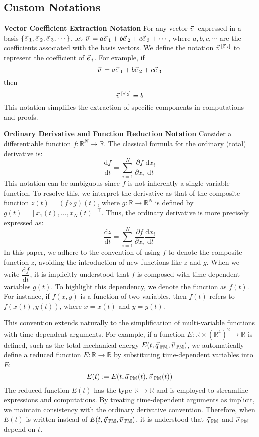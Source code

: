 \documentclass[12pt]{amsart}
\let\oldvec\vec
\renewcommand{\vec}[1]{\oldvec{#1}\hspace{0.1em}}
\begin{document}
\subsection{Custom Notations}

\textbf{Vector Coefficient Extraction Notation}  
   For any vector $\vec{v}$ expressed in a basis $\{\vec{e}_1, \vec{e}_2, \vec{e}_3, \cdots\}$, let $\vec{v} = a\vec{e}_1 + b\vec{e}_2 + c\vec{e}_3 + \cdots$, where $a, b, c, \cdots$ are the coefficients associated with the basis vectors. We define the notation $\vec{v}^{[\vec{e}_i]}$ to represent the coefficient of $\vec{e}_i$. For example, if
   $$
   \vec{v} = a \vec{e}_1 + b \vec{e}_2 + c \vec{e}_3
   $$
   then
   $$
   \vec{v}^{[\vec{e}_2]} = b
   $$
   This notation simplifies the extraction of specific components in computations and proofs.

\textbf{Ordinary Derivative and Function Reduction Notation}  
   Consider a differentiable function $f: \mathbb{R}^N \to \mathbb{R}$. The classical formula for the ordinary (total) derivative is:
   $$
   \dfrac{\mathrm{d} f}{\mathrm{d} t} = \sum_{i=1}^N \dfrac{\partial f}{\partial x_i} \dfrac{\mathrm{d} x_i}{\mathrm{d} t}
   $$
   This notation can be ambiguous since $f$ is not inherently a single-variable function. To resolve this, we interpret the derivative as that of the composite function $z(t) = (f \circ g)(t)$, where $g: \mathbb{R} \to \mathbb{R}^N$ is defined by $g(t) = [x_1(t), \dots, x_N(t)]^\top$. Thus, the ordinary derivative is more precisely expressed as:
   $$
   \dfrac{\mathrm{d} z}{\mathrm{d} t} = \sum_{i=1}^N \dfrac{\partial f}{\partial x_i} \dfrac{\mathrm{d} x_i}{\mathrm{d} t}
   $$
   In this paper, we adhere to the convention of using $f$ to denote the composite function $z$, avoiding the introduction of new functions like $z$ and $g$. When we write $\dfrac{\mathrm{d} f}{\mathrm{d} t}$, it is implicitly understood that $f$ is composed with time-dependent variables $g(t)$. To highlight this dependency, we denote the function as $f(t)$. For instance, if $f(x, y)$ is a function of two variables, then $f(t)$ refers to $f(x(t), y(t))$, where $x = x(t)$ and $y = y(t)$.

   This convention extends naturally to the simplification of multi-variable functions with time-dependent arguments. For example, if a function $E: \mathbb{R} \times (\mathbb{R}^4)^2 \to \mathbb{R}$ is defined, such as the total mechanical energy $E(t, \vec{q}_\mathbb{PM}, \vec{v}_\mathbb{PM})$, we automatically define a reduced function $E: \mathbb{R} \to \mathbb{R}$ by substituting time-dependent variables into $E$:
   $$
   E(t) := E(t, \vec{q}_\mathbb{PM}(t), \vec{v}_\mathbb{PM}(t))
   $$
   The reduced function $E(t)$ has the type $\mathbb{R} \to \mathbb{R}$ and is employed to streamline expressions and computations. By treating time-dependent arguments as implicit, we maintain consistency with the ordinary derivative convention. Therefore, when $E(t)$ is written instead of $E(t, \vec{q}_\mathbb{PM}, \vec{v}_\mathbb{PM})$, it is understood that $\vec{q}_\mathbb{PM}$ and $\vec{v}_\mathbb{PM}$ depend on $t$.
\end{document}
